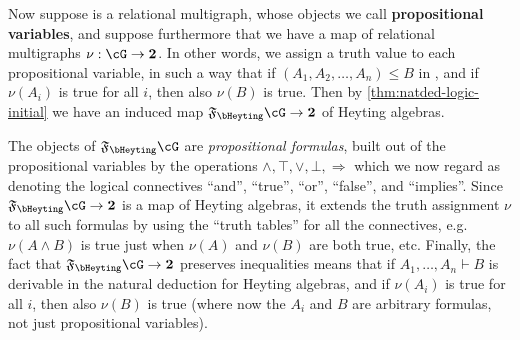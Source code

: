 \documentclass{book}
\def\tv{\mathbf{2}}
\let\types\vdash
\newcommand{\F}[1]{\mathfrak{F}_{#1}}
\let\meet\wedge
\let\join\vee
\let\To\Rightarrow
\begin{document}
Now suppose \cG is a relational multigraph, whose objects we call \textbf{propositional variables}, and suppose furthermore that we have a map of relational multigraphs $\nu:\cG\to\tv$.
In other words, we assign a truth value to each propositional variable, in such a way that if $(A_1,A_2,\dots,A_n)\le B$ in \cG, and if $\nu(A_i)$ is true for all $i$, then also $\nu(B)$ is true.
Then by \cref{thm:natded-logic-initial} we have an induced map $\F\bHeyting\cG \to \tv$ of Heyting algebras.

The objects of $\F\bHeyting\cG$ are \emph{propositional formulas}, built out of the propositional variables by the operations $\meet,\top,\join,\bot,\To$ which we now regard as denoting the logical connectives ``and'', ``true'', ``or'', ``false'', and ``implies''.
Since $\F\bHeyting\cG \to \tv$ is a map of Heyting algebras, it extends the truth assignment $\nu$ to all such formulas by using the ``truth tables'' for all the connectives, e.g.\ $\nu(A\meet B)$ is true just when $\nu(A)$ and $\nu(B)$ are both true, etc.
Finally, the fact that $\F\bHeyting\cG \to \tv$ preserves inequalities means that if $A_1,\dots,A_n \types B$ is derivable in the natural deduction for Heyting algebras, and if $\nu(A_i)$ is true for all $i$, then also $\nu(B)$ is true (where now the $A_i$ and $B$ are arbitrary formulas, not just propositional variables).
\end{document}

